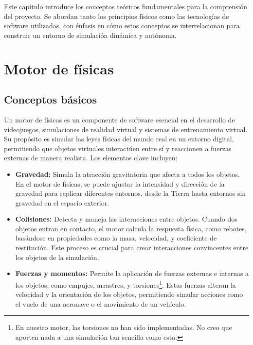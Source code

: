 Este capítulo introduce los conceptos teóricos fundamentales para la comprensión del proyecto. Se abordan tanto los principios físicos como las tecnologías de software utilizadas, con énfasis en cómo estos conceptos se interrelacionan para construir un entorno de simulación dinámica y autónoma.

\section{Motor de físicas}

\subsection{Conceptos básicos}
Un motor de físicas es un componente de software esencial en el desarrollo de videojuegos, simulaciones de realidad virtual y sistemas de entrenamiento virtual. Su propósito es simular las leyes físicas del mundo real en un entorno digital, permitiendo que objetos virtuales interactúen entre sí y reaccionen a fuerzas externas de manera realista. Los elementos clave incluyen:

\begin{itemize}
    \item \textbf{Gravedad:} Simula la atracción gravitatoria que afecta a todos los objetos. En el motor de físicas, se puede ajustar la intensidad y dirección de la gravedad para replicar diferentes entornos, desde la Tierra hasta entornos sin gravedad en el espacio exterior.
    
    \item \textbf{Colisiones:} Detecta y maneja las interacciones entre objetos. Cuando dos objetos entran en contacto, el motor calcula la respuesta física, como rebotes, basándose en propiedades como la masa, velocidad, y coeficiente de restitución. Este proceso es crucial para crear interacciones convincentes entre los objetos de la simulación.
    
    \item \textbf{Fuerzas y momentos:} Permite la aplicación de fuerzas externas e internas a los objetos, como empujes, arrastres, y torsiones\footnote{En nuestro motor, las torsiones no han sido implementadas. No creo que aporten nada a una simulación tan sencilla como esta.}. Estas fuerzas alteran la velocidad y la orientación de los objetos, permitiendo simular acciones como el vuelo de una aeronave o el movimiento de un vehículo.
\end{itemize}


